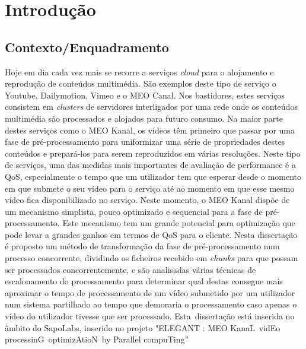 \chapter{Introdução} \label{chap:intro}

\section{Contexto/Enquadramento} \label{sec:context}

Hoje em dia cada vez mais se recorre a serviços \textit{cloud} para o alojamento e reprodução de conteúdos multimédia. São exemplos deste tipo de serviço o Youtube, Dailymotion, Vimeo e o MEO Canal.
Nos bastidores, estes serviços consistem em \textit{clusters} de servidores interligados por uma rede onde os conteúdos multimédia são processados e alojados para futuro consumo.
Na maior parte destes serviços como o MEO Kanal, os vídeos têm primeiro que passar por uma fase de pré-processamento para uniformizar uma série de propriedades destes conteúdos e prepará-los para serem reproduzidos em várias resoluções.
Neste tipo de serviços, uma das medidas mais importantes de avaliação de performance é a QoS, especialmente o tempo que um utilizador tem que esperar desde o momento em que submete o seu vídeo para o serviço até ao momento em que esse mesmo vídeo fica disponibilizado no serviço.
Neste momento, o MEO Kanal dispõe de um mecanismo simplista, pouco optimizado e sequencial para a fase de pré-processamento. Este mecanismo tem um grande potencial para optimização que pode levar a grandes ganhos em termos de QoS para o cliente.
Nesta dissertação é proposto um método de transformação da fase de pré-processamento num processo concorrente, dividindo os ficheiros recebido em \textit{chunks} para que possam ser processados concorrentemente, e são analisadas várias técnicas de escalonamento do processamento para determinar qual destas consegue mais aproximar o tempo de processamento de um vídeo submetido por um utilizador num sistema partilhado ao tempo que demoraria o processamento caso apenas o vídeo do utilizador tivesse que ser processado.
Esta dissertação está inserida no âmbito do SapoLabs, inserido no projeto "ELEGANT : MEO KanaL vidEo processinG optimizAtioN by Parallel compuTing”


